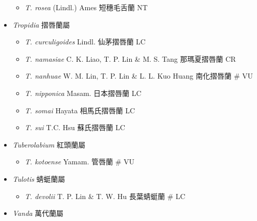 \begin{itemize}
  \begin{itemize}
        \item[] \textit{T. rosea} (Lindl.) Ames  短穗毛舌蘭   NT
  \end{itemize}
 \item[] \textit{Tropidia} 摺唇蘭屬
                                
  \begin{itemize}
        \item[] \textit{T. curculigoides} Lindl.  仙茅摺唇蘭   LC
        \item[] \textit{T. namasiae} C. K. Liao, T. P. Lin \& M. S. Tang  那瑪夏摺唇蘭   CR
        \item[] \textit{T. nanhuae} W. M. Lin, T. P. Lin \& L. L. Kuo Huang  南化摺唇蘭  \# VU
        \item[] \textit{T. nipponica} Masam.  日本摺唇蘭   LC
        \item[] \textit{T. somai} Hayata  相馬氏摺唇蘭   LC
        \item[] \textit{T. sui} T.C. Hsu  蘇氏摺唇蘭   LC
  \end{itemize}
 \item[] \textit{Tuberolabium} 紅頭蘭屬
                                
  \begin{itemize}
        \item[] \textit{T. kotoense} Yamam.  管唇蘭  \# VU
  \end{itemize}
 \item[] \textit{Tulotis} 蜻蜓蘭屬
                                
  \begin{itemize}
        \item[] \textit{T. devolii} T. P. Lin \& T. W. Hu  長葉蜻蜓蘭  \# LC
  \end{itemize}
 \item[] \textit{Vanda} 萬代蘭屬
                                

\end{itemize}
